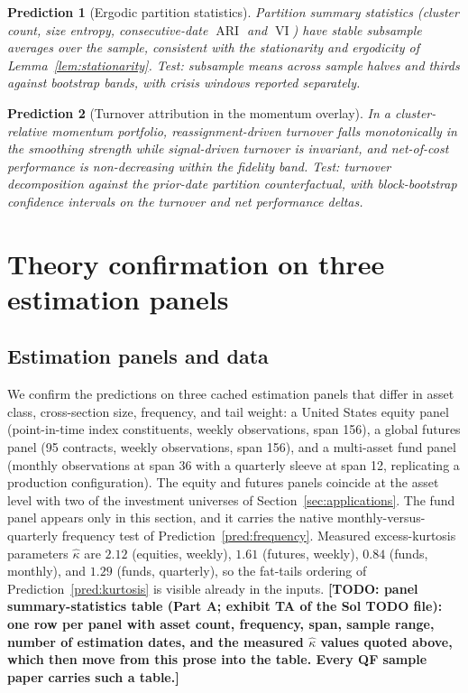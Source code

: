 \documentclass[11pt]{article}
\newtheorem{prediction}{Prediction}
\theoremstyle{remark}
\newcommand{\ARI}{\operatorname{ARI}}
\newcommand{\VI}{\operatorname{VI}}
\newcommand{\TODO}[1]{\textbf{[TODO: #1]}}
\begin{document}
\begin{prediction}[Ergodic partition statistics]
\label{pred:ergodicity}
Partition summary statistics (cluster count, size entropy, consecutive-date
$\ARI$ and $\VI$) have stable subsample averages over the sample, consistent
with the stationarity and ergodicity of Lemma~\ref{lem:stationarity}. Test:
subsample means across sample halves and thirds against bootstrap bands, with
crisis windows reported separately.
\end{prediction}

\begin{prediction}[Turnover attribution in the momentum overlay]
\label{pred:turnover}
In a cluster-relative momentum portfolio, reassignment-driven turnover falls
monotonically in the smoothing strength while signal-driven turnover is
invariant, and net-of-cost performance is non-decreasing within the fidelity
band. Test: turnover decomposition against the prior-date partition
counterfactual, with block-bootstrap confidence intervals on the turnover and
net performance deltas.
\end{prediction}

\section{Theory confirmation on three estimation panels}
\label{sec:confirmation}

\subsection{Estimation panels and data}
\label{sec:panels}

We confirm the predictions on three cached estimation panels that differ in
asset class, cross-section size, frequency, and tail weight: a United States
equity panel (point-in-time index constituents, weekly observations, span
156), a global futures panel (95 contracts, weekly observations, span 156),
and a multi-asset fund panel (monthly observations at span 36 with a quarterly
sleeve at span 12, replicating a production configuration). The equity and
futures panels coincide at the asset level with two of the investment
universes of Section~\ref{sec:applications}. The fund panel appears only in
this section, and it carries the native monthly-versus-quarterly frequency
test of Prediction~\ref{pred:frequency}. Measured excess-kurtosis parameters
$\widehat{\kappa}$ are $2.12$ (equities, weekly), $1.61$ (futures, weekly),
$0.84$ (funds, monthly), and $1.29$ (funds, quarterly), so the fat-tails
ordering of Prediction~\ref{pred:kurtosis} is visible already in the inputs.
\TODO{panel summary-statistics table (Part A; exhibit TA of the Sol TODO
file): one row per panel with asset count, frequency, span, sample range,
number of estimation dates, and the measured $\widehat{\kappa}$ values quoted
above,
which then move from this prose into the table. Every QF sample paper carries
such a table.}
\end{document}
